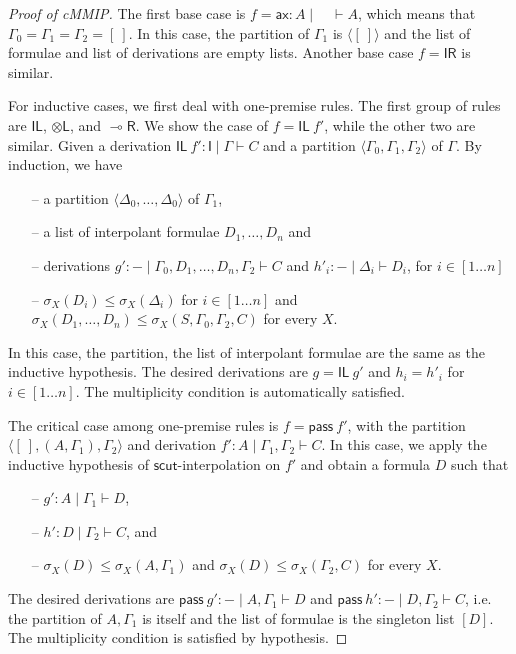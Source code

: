 \documentclass[sn-mathphys-num]{sn-jnl}%
\newcommand{\GG}{\Gamma}
\newcommand{\GD}{\Delta}
\newcommand{\vd}{\vdash}
\newcommand{\tl}{\otimes \mathsf{L}}
\newcommand{\pass}{\mathsf{pass}}
\newcommand{\unitl}{\mathsf{IL}}
\newcommand{\unitr}{\mathsf{IR}}
\newcommand{\ax}{\mathsf{ax}}
\newcommand{\lolli}{\multimap}
\newcommand{\lright}{{\lolli}\mathsf{R}}
\newcommand{\unit}{\mathsf{I}}
\newcommand{\mf}[1]{\mathsf{#1}}
\newcommand{\gs}[1]{\sigma_{X} (#1)}
\newcommand{\cMMIP}{\textsf{cMMIP}}
\theoremstyle{thmstyleone}%
\theoremstyle{thmstyletwo}%
\theoremstyle{thmstylethree}%
\begin{document}
\begin{proof}[Proof of \cMMIP]
The first base case is $f  = \ax : A \mid \quad \vd A$, which means that $\GG_0 = \GG_1 = \GG_2 = [\ ]$.
In this case, the partition of $\GG_1$ is $\langle [\ ] \rangle$ and the list of formulae and list of derivations are empty lists.
Another base case $f = \unitr$ is similar.

For inductive cases, we first deal with one-premise rules. 
The first group of rules are $\unitl$, $\tl$, and $\lright$. 
We show the case of $f = \unitl \ f'$, while the other two are similar.
Given a derivation $\unitl \ f' : \unit \mid \GG \vd C$ and a partition $\langle \GG_0 , \GG_1 , \GG_2\rangle$ of $\GG$.
By induction, we have 
\begin{itemize}
  \item[--] a partition $\langle \GD_0, \dots , \GD_0 \rangle$ of $\GG_1$, 
  \item[--] a list of interpolant formulae $D_1, \dots , D_n$ and
  \item[--] derivations $g' : {-} \mid \GG_0 , D_1 , \dots , D_n , \GG_2 \vd C$ and $h'_i : {-} \mid \GD_i \vd D_i$, for $i \in [1 \dots n]$
  \item[--]  $\gs{D_i} \leq \gs{\GD_i}$ for $i \in [1 \dots n]$ and $\gs{D_1, \dots, D_n} \leq \gs{S, \GG_0, \GG_2, C}$ for every $X$.
\end{itemize}
In this case, the partition, the list of interpolant formulae are the same as the inductive hypothesis.
The desired derivations are $g = \unitl \ g'$ and $h_i = h'_i$ for $i \in [1 \dots n]$.
The multiplicity condition is automatically satisfied.

The critical case among one-premise rules is $f = \pass \ f'$, with the partition $\langle [\ ], (A, \GG_1) , \GG_2 \rangle$ and derivation $f' : A \mid \GG_1 , \GG_2 \vd C$.
In this case, we apply the inductive hypothesis of $\mf{scut}$-interpolation on $f'$ and obtain a formula $D$ such that 
\begin{itemize}
  \item[--] $g': A \mid \GG_1 \vd D$,
  \item[--] $h' : D \mid \GG_2 \vd C$, and
  \item[--] $\gs{D} \leq \gs{A , \GG_1}$ and $\gs{D} \leq \gs{\GG_2 , C}$ for every $X$.
\end{itemize}
The desired derivations are $\pass \ g' : {-} \mid A , \GG_1 \vd D$ and $\pass \ h' : {-} \mid D, \GG_2 \vd C$, i.e. the partition of $A, \GG_1$ is itself and the list of formulae is the singleton list $[D]$.
The multiplicity condition is satisfied by hypothesis.


\end{proof}
\end{document}
